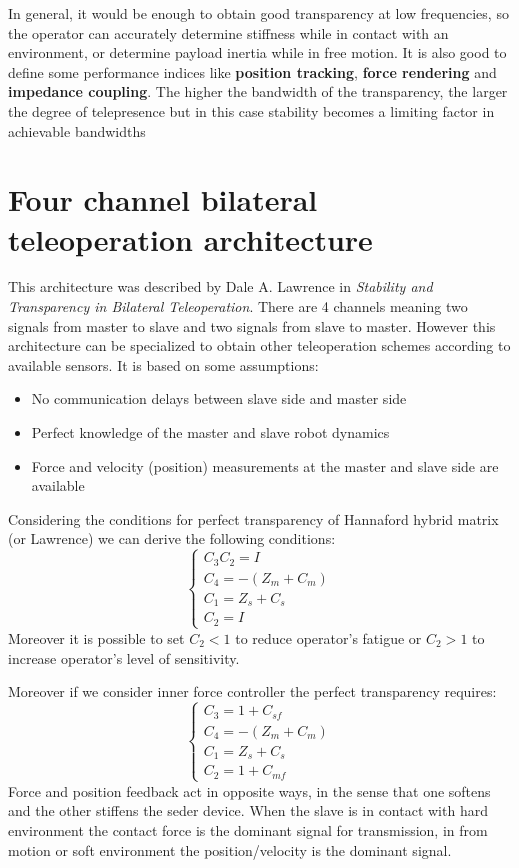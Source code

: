 \documentclass[a4paper,12pt]{article}
\begin{document}
In general, it would be enough to obtain good transparency at low frequencies, so the
operator can accurately determine stiffness while in contact with an environment, or
determine payload inertia while in free motion. It is also good to define some performance indices like \textbf{position tracking}, \textbf{force rendering} and \textbf{impedance coupling}.
The higher the bandwidth of the transparency, the larger the degree of telepresence but in this case stability becomes a limiting factor in achievable bandwidths

\section{Four channel bilateral teleoperation architecture}

This architecture was described by Dale A. Lawrence in \textit{Stability and Transparency in Bilateral Teleoperation}. There are 4 channels meaning two signals from master to slave and two signals from slave to master. However this architecture can be specialized to obtain other teleoperation schemes according to available sensors. It is based on some assumptions:
\begin{itemize}
    \item No communication delays between slave side and master side
    \item Perfect knowledge of the master and slave robot dynamics
    \item Force and velocity (position) measurements at the master and slave side are available
\end{itemize}
Considering the conditions for perfect transparency of Hannaford hybrid matrix (or Lawrence) we can derive the following conditions:
\[
\begin{cases}
    C_3C_2 = I\\
    C_4 = -(Z_m + C_m) \\
    C_1 = Z_s + C_s \\
    C_2 = I
\end{cases}
\]
Moreover it is possible to set $C_2 < 1$ to reduce operator's fatigue or $C_2 > 1$ to increase operator's level of sensitivity. 

\bigskip
\noindent Moreover if we consider inner force controller the perfect transparency requires:
\[
\begin{cases}
    C_3 = 1 + C_{sf}\\
    C_4 = -(Z_m + C_m) \\
    C_1 = Z_s + C_s \\
    C_2 = 1 + C_{mf}
\end{cases}
\]
Force and position feedback act in opposite ways, in the sense that one softens and the other stiffens the seder device. When the slave is in contact with hard environment the contact force is the dominant signal for transmission, in from motion or soft environment the position/velocity is the dominant signal.
\end{document}
